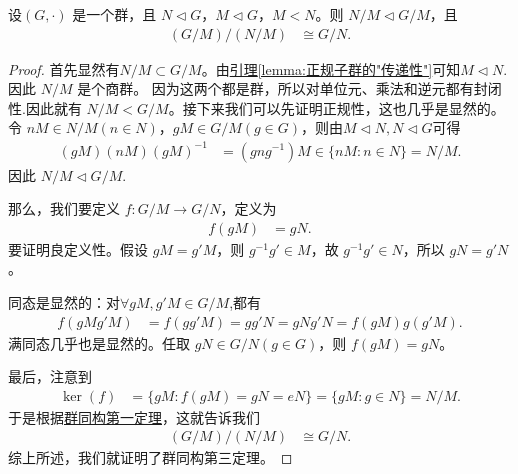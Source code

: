 \documentclass[../../main.tex]{subfiles}
\begin{document}
\begin{theorem}[群同构第三定理]\label{theorem:群同构第三定理}
设\((G, \cdot)\) 是一个群，且 \(N \lhd G\)，\(M \lhd G\)，\(M < N\)。则 \(N/M \lhd G/M\)，且
\begin{align*}
(G/M)/(N/M) &\cong G/N .
\end{align*}
\end{theorem}
\begin{proof}
首先显然有\(N/M \subset G/M\)。由\hyperref[lemma:正规子群的"传递性"]{引理\ref{lemma:正规子群的"传递性"}}可知$M\lhd N$.因此 \(N/M\) 是个商群。
因为这两个都是群，所以对单位元、乘法和逆元都有封闭性.因此就有 \(N/M < G/M\)。接下来我们可以先证明正规性，这也几乎是显然的。令 \(nM \in N/M (n \in N)\)，\(gM \in G/M (g \in G)\)，则由$M\lhd N,N\lhd G$可得
\begin{align*}
(gM)(nM)(gM)^{-1} &= (gng^{-1})M \in \{nM : n \in N\} = N/M .
\end{align*}
因此 \(N/M \lhd G/M\).

那么，我们要定义 \(f: G/M \to G/N\)，定义为
\begin{align*}
f(gM) &= gN .
\end{align*}
要证明良定义性。假设 \(gM = g'M\)，则 \(g^{-1}g' \in M\)，故 \(g^{-1}g' \in N\)，所以 \(gN = g'N\)。

同态是显然的：对$\forall gM,g'M\in G/M$,都有
\begin{align*}
f(gMg'M) &= f(gg'M) = gg'N = gNg'N = f(gM)g(g'M) .
\end{align*}
满同态几乎也是显然的。任取 \(gN \in G/N (g \in G)\)，则 \(f(gM) = gN\)。

最后，注意到
\begin{align*}
\ker(f) &= \{gM : f(gM) = gN = eN\} = \{gM : g \in N\} = N/M .
\end{align*}
于是根据\hyperref[theorem:群同构第一定理]{群同构第一定理}，这就告诉我们
\begin{align*}
(G/M)/(N/M) &\cong G/N.
\end{align*}
综上所述，我们就证明了群同构第三定理。 
\end{proof}
\end{document}
